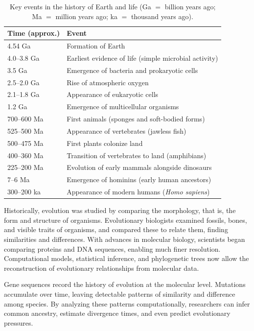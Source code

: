 \begin{table}[ht]
\centering
\caption{Key events in the history of Earth and life (Ga $=$ billion years ago; Ma $=$ million years ago; ka $=$ thousand years ago).}
\label{t:history-earth}
\begin{tabular}{ll}
\hline
\textbf{Time (approx.)} & \textbf{Event} \\
\hline
4.54 Ga & Formation of Earth \\
4.0--3.8 Ga & Earliest evidence of life (simple microbial activity) \\
3.5 Ga & Emergence of bacteria and prokaryotic cells \\
2.5--2.0 Ga & Rise of atmospheric oxygen \\
2.1--1.8 Ga & Appearance of eukaryotic cells \\
1.2 Ga & Emergence of multicellular organisms \\
700--600 Ma & First animals (sponges and soft-bodied forms) \\
525--500 Ma & Appearance of vertebrates (jawless fish) \\
500--475 Ma & First plants colonize land \\
400--360 Ma & Transition of vertebrates to land (amphibians) \\
225--200 Ma & Evolution of early mammals alongside dinosaurs \\
7--6 Ma & Emergence of hominins (early human ancestors) \\
300--200 ka & Appearance of modern humans (\textit{Homo sapiens}) \\
\hline
\end{tabular}
\end{table}

Historically, evolution was studied by comparing the morphology, that is, the form and structure of organisms. Evolutionary biologists examined fossils, bones, and visible traits of organisms, and compared these to relate them, finding similarities and differences. With advances in molecular biology, scientists began comparing proteins and DNA sequences, enabling much finer resolution. Computational models, statistical inference, and phylogenetic trees now allow the reconstruction of evolutionary relationships from molecular data.

Gene sequences record the history of evolution at the molecular level. Mutations accumulate over time, leaving detectable patterns of similarity and difference among species. By analyzing these patterns computationally, researchers can infer common ancestry, estimate divergence times, and even predict evolutionary pressures.

